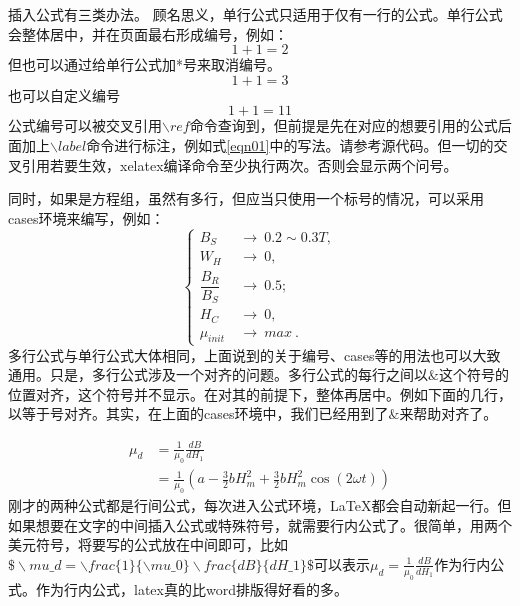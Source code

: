插入公式有三类办法。
顾名思义，单行公式只适用于仅有一行的公式。单行公式会整体居中，并在页面最右形成编号，例如：
\begin{equation}
1+1=2\label{eqn01}
\end{equation}
但也可以通过给单行公式加*号来取消编号。
\begin{equation*}
1+1=3
\end{equation*}
也可以自定义编号
\begin{equation}
1+1=11\tag{99}
\end{equation}
公式编号可以被交叉引用$\backslash ref$命令查询到，但前提是先在对应的想要引用的公式后面加上$\backslash label$命令进行标注，例如式\ref{eqn01}中的写法。请参考源代码。但一切的交叉引用若要生效，xelatex编译命令至少执行两次。否则会显示两个问号。\par
同时，如果是方程组，虽然有多行，但应当只使用一个标号的情况，可以采用cases环境来编写，例如：
\begin{equation}
\begin{cases}
B_S &\to\ 0.2\sim0.3T,\\
W_H&\to\ 0,\\
\dfrac{B_R}{B_S}&\to\ 0.5;\\
H_C&\to\ 0,\\
\mu_{init}\ &\to\  max\ .
\end{cases}
\end{equation}
多行公式与单行公式大体相同，上面说到的关于编号、cases等的用法也可以大致通用。只是，多行公式涉及一个对齐的问题。多行公式的每行之间以$\&$这个符号的位置对齐，这个符号并不显示。在对其的前提下，整体再居中。例如下面的几行，以等于号对齐。其实，在上面的cases环境中，我们已经用到了$\&$来帮助对齐了。\par
\begin{align}
\mu_d&=\frac{1}{\mu_0}\frac{dB}{dH_1}\\
&=\frac{1}{\mu_0}\left(a-\frac{3}{2}bH_m^2+\frac{3}{2}bH_m^2\cos (2\omega t)\right)
\end{align}
刚才的两种公式都是行间公式，每次进入公式环境，LaTeX都会自动新起一行。但如果想要在文字的中间插入公式或特殊符号，就需要行内公式了。很简单，用两个美元符号，将要写的公式放在中间即可，比如$\$\backslash mu\_d=\backslash frac\{1\}\{\backslash mu\_0\}\backslash frac\{dB\}\{dH\_1\}\$$可以表示$\mu_d=\frac{1}{\mu_0}\frac{dB}{dH_1}$作为行内公式。作为行内公式，latex真的比word排版得好看的多。